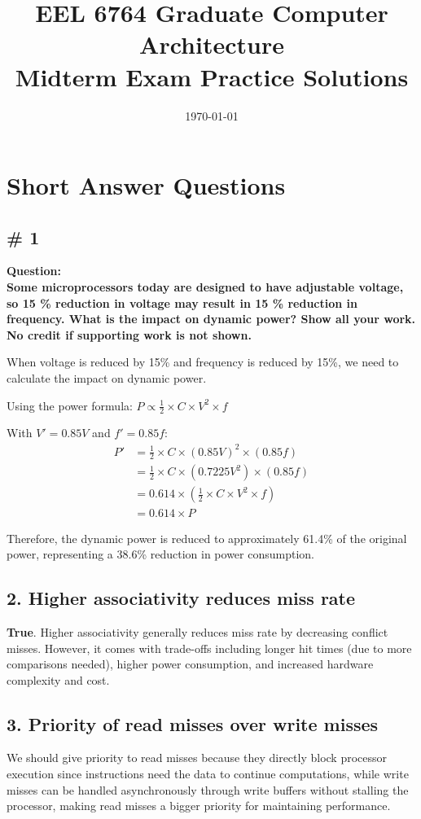 \documentclass[12pt]{article}
\title{EEL 6764 Graduate Computer Architecture\\Midterm Exam Practice Solutions}
\author{}
\date{\today}
\begin{document}
\maketitle
\newpage

\section*{Short Answer Questions}

\subsection*{\# 1}

\textbf{Question: \\
Some microprocessors today are designed to have adjustable voltage, so 15 \% reduction in voltage may result in 15 \% reduction in frequency. What is the impact on dynamic power? Show all your work. No credit if supporting work is not shown.}

When voltage is reduced by 15\% and frequency is reduced by 15\%, we need to calculate the impact on dynamic power.

Using the power formula: $P \propto \frac{1}{2} \times C \times V^2 \times f$

With $V' = 0.85V$ and $f' = 0.85f$:
\begin{align}
P' &= \frac{1}{2} \times C \times (0.85V)^2 \times (0.85f)\\
&= \frac{1}{2} \times C \times (0.7225V^2) \times (0.85f)\\
&= 0.614 \times \left(\frac{1}{2} \times C \times V^2 \times f\right)\\
&= 0.614 \times P
\end{align}

Therefore, the dynamic power is reduced to approximately 61.4\% of the original power, representing a 38.6\% reduction in power consumption.

\subsection*{2. Higher associativity reduces miss rate}
\textbf{True}. Higher associativity generally reduces miss rate by decreasing conflict misses. However, it comes with trade-offs including longer hit times (due to more comparisons needed), higher power consumption, and increased hardware complexity and cost.

\subsection*{3. Priority of read misses over write misses}
We should give priority to read misses because they directly block processor execution since instructions need the data to continue computations, while write misses can be handled asynchronously through write buffers without stalling the processor, making read misses a bigger priority for maintaining performance.
\end{document}
